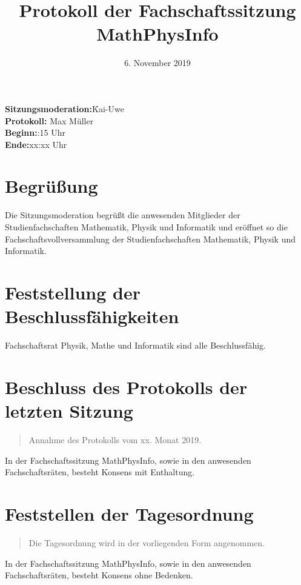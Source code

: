 \documentclass[11pt, fachschaft=mathphys,twosided=true]{mathphys/mathphys-article}
\newenvironment{antrag}{\begin{quote}\begin{itshape}}{\end{itshape}\end{quote}}
\newcommand{\konsens}[1]{In der Fachschaftssitzung MathPhysInfo, sowie in den anwesenden Fachschaftsräten, besteht Konsens ohne Bedenken.\\} %
\newcommand{\konsensE}[1]{In der Fachschaftssitzung MathPhysInfo, sowie in den anwesenden Fachschaftsräten, besteht Konsens mit Enthaltung.\\} %
\begin{document}
\date{\vspace{-2em}6. November 2019\vspace{-1em}} %
\title{\vspace{-2em}Protokoll der Fachschaftssitzung MathPhysInfo}
\maketitle

\begin{tabbing}
    \textbf{Sitzungsmoderation:}\quad\=Kai-Uwe \\ %
    \textbf{Protokoll:}\> Max M\"uller \\%
    \textbf{Beginn:}:15 Uhr\\
    \textbf{Ende:}\>xx:xx Uhr\\ %
\end{tabbing}

\section{Begrüßung}
    Die Sitzungsmoderation begrüßt die anwesenden Mitglieder der Studienfachschaften Mathematik, Physik und Informatik und eröffnet so die Fachschaftsvollversammlung der Studienfachschaften Mathematik, Physik und Informatik.

\section{Feststellung der Beschlussfähigkeiten}
    Fachschaftsrat Physik, Mathe und Informatik sind alle Beschlussfähig.

\section{Beschluss des Protokolls der letzten Sitzung}

\begin{antrag}
	Annahme des Protokolls vom xx. Monat 2019.
\end{antrag}
\konsensE{}

\section{Feststellen der Tagesordnung}
\begin{antrag}
    Die Tagesordnung wird in der vorliegenden Form angenommen.
\end{antrag}
\konsens{}
\end{document}
